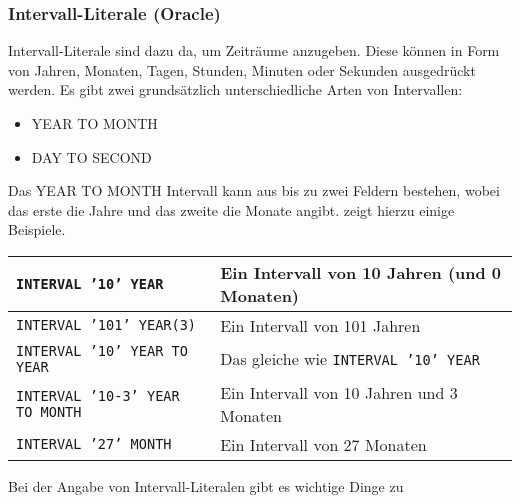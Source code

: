         \subsubsection{Intervall-Literale (Oracle)}
          Intervall-Literale sind dazu da, um Zeitr\"aume anzugeben. Diese
          k\"onnen in Form von Jahren, Monaten, Tagen, Stunden, Minuten oder
          Sekunden ausgedr\"uckt werden. Es gibt zwei grunds\"atzlich 
          unterschiedliche Arten von Intervallen:
          \begin{itemize}
            \item YEAR TO MONTH
            \item DAY TO SECOND
          \end{itemize}
          Das YEAR TO MONTH Intervall kann aus bis zu zwei Feldern bestehen,
           wobei das erste die Jahre und das zweite die Monate angibt.
            zeigt hierzu einige Beispiele.
          \begin{center}
            \label{yeartomonth}
            \begin{small}
              \tabletail{
                \hline
              }
              \tablelasttail{
                \hline
              }
              \begin{supertabular}{|l|p{9cm}|}
                \texttt{INTERVAL '10' YEAR} & Ein Intervall von 10 Jahren (und 0 Monaten) \\
                \hline
                \texttt{INTERVAL '101' YEAR(3)} & Ein Intervall von 101 Jahren \\
                \hline
                \texttt{INTERVAL '10' YEAR TO YEAR} & Das gleiche wie \texttt{INTERVAL '10' YEAR} \\
                \hline
                \texttt{INTERVAL '10-3' YEAR TO MONTH} & Ein Intervall von 10 Jahren und 3 Monaten \\
                \hline
                \texttt{INTERVAL '27' MONTH} & Ein Intervall von 27 Monaten \\
              \end{supertabular}
            \end{small}
          \end{center}
           Bei der Angabe von Intervall-Literalen gibt es wichtige Dinge zu
